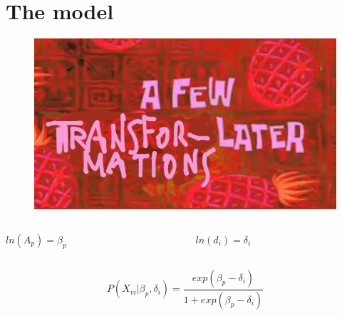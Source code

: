\documentclass{beamer}
\begin{document}
\section{The model}
\begin{frame}
\begin{figure}
	\centering
	\includegraphics[width=0.5\linewidth]{later}
\end{figure}
\begin{columns}[T]
	\begin{column}{.5\linewidth}
		\centering
		$ln(A_p) = \beta_p$
	\end{column}
	\begin{column}{.5\linewidth}
	\centering
	$ln(d_i) = \delta_i$
\end{column}
\end{columns}

\vspace{3mm}
\begin{equation}
P(X_{vi}|\beta_p, \delta_i) = \dfrac{exp(\beta_p - \delta_i)}{1 + exp(\beta_p - \delta_i)}
\end{equation}
\end{frame}
\end{document}
